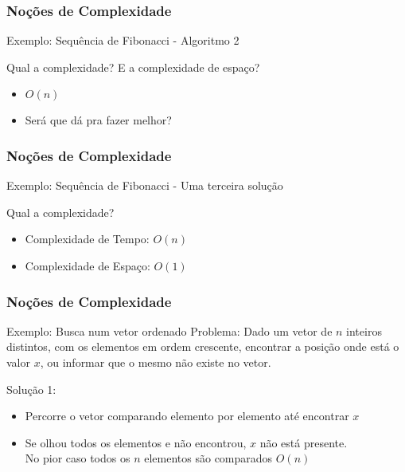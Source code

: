 \begin{frame}
\frametitle{Noções de Complexidade}

\begin{block}{Exemplo: Sequência de Fibonacci - Algoritmo 2}
\end{block}

\begin{block}{Qual a complexidade?}
E a complexidade de espaço?
\begin{itemize}
	\item[]<2-> $O(n)$
	\item[]<3-> Será que dá pra fazer melhor?
\end{itemize}
\end{block}
\end{frame}


\begin{frame}
\frametitle{Noções de Complexidade}

\begin{block}{Exemplo: Sequência de Fibonacci - Uma terceira solução}
\end{block}

\begin{block}{Qual a complexidade?}
\begin{itemize}
	\item[] Complexidade de Tempo: $O(n)$
	\item[] Complexidade de Espaço: $O(1)$
\end{itemize}
\end{block}
\end{frame}

\begin{frame}
\frametitle{Noções de Complexidade}

\begin{block}{Exemplo: Busca num vetor ordenado}
Problema: Dado um vetor de $n$ inteiros distintos, com os elementos em ordem crescente,
encontrar a posição onde está o valor $x$, ou informar que o mesmo não existe no vetor.\\
\end{block}
\pause
\begin{block}{Solução 1:}
\begin{itemize}
	\item[] Percorre o vetor comparando elemento por elemento até encontrar $x$
	\item[] Se olhou todos os elementos e não encontrou, $x$ não está presente.\\

	\bitem<3-> No pior caso todos os $n$ elementos são comparados
	\bitem<3-> $O(n)$
\end{itemize}
\end{block}

\end{frame}

